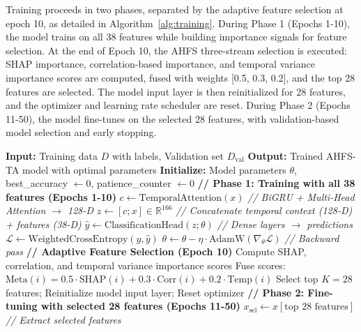 \documentclass[journal]{IEEEtran}
\begin{document}
Training proceeds in two phases, separated by the adaptive feature selection at epoch 10, as detailed in Algorithm~\ref{alg:training}. During Phase 1 (Epochs 1-10), the model trains on all 38 features while building importance signals for feature selection. At the end of Epoch 10, the AHFS three-stream selection is executed: SHAP importance, correlation-based importance, and temporal variance importance scores are computed, fused with weights [0.5, 0.3, 0.2], and the top 28 features are selected. The model input layer is then reinitialized for 28 features, and the optimizer and learning rate scheduler are reset. During Phase 2 (Epochs 11-50), the model fine-tunes on the selected 28 features, with validation-based model selection and early stopping.

\begin{algorithm}[h]
\caption{AHFS-TA Complete Training Procedure}
\label{alg:training}
\begin{algorithmic}[1]
\STATE \textbf{Input:} Training data $D$ with labels, Validation set $D_{\text{val}}$
\STATE \textbf{Output:} Trained AHFS-TA model with optimal parameters
\STATE \textbf{Initialize:} Model parameters $\theta$, best\_accuracy $\leftarrow 0$, patience\_counter $\leftarrow 0$
\STATE
\STATE \textbf{// Phase 1: Training with all 38 features (Epochs 1-10)}
        \STATE $c \leftarrow \text{TemporalAttention}(x)$ \quad \textit{// BiGRU + Multi-Head Attention $\rightarrow$ 128-D}
        \STATE $z \leftarrow [c; x] \in \mathbb{R}^{166}$ \quad \textit{// Concatenate temporal context (128-D) + features (38-D)}
        \STATE $\hat{y} \leftarrow \text{ClassificationHead}(z; \theta)$ \quad \textit{// Dense layers $\rightarrow$ predictions}
        \STATE $\mathcal{L} \leftarrow \text{WeightedCrossEntropy}(y, \hat{y})$
        \STATE $\theta \leftarrow \theta - \eta \cdot \text{AdamW}(\nabla_\theta \mathcal{L})$ \quad \textit{// Backward pass}
    \ENDFOR
\ENDFOR
\STATE
\STATE \textbf{// Adaptive Feature Selection (Epoch 10)}
\STATE Compute SHAP, correlation, and temporal variance importance scores
\STATE Fuse scores: $\text{Meta}(i) = 0.5 \cdot \text{SHAP}(i) + 0.3 \cdot \text{Corr}(i) + 0.2 \cdot \text{Temp}(i)$
\STATE Select top $K=28$ features; Reinitialize model input layer; Reset optimizer
\STATE
\STATE \textbf{// Phase 2: Fine-tuning with selected 28 features (Epochs 11-50)}
        \STATE $x_{\text{sel}} \leftarrow x[\text{top 28 features}]$ \quad \textit{// Extract selected features}

\end{algorithmic}
\end{algorithm}
\end{document}
